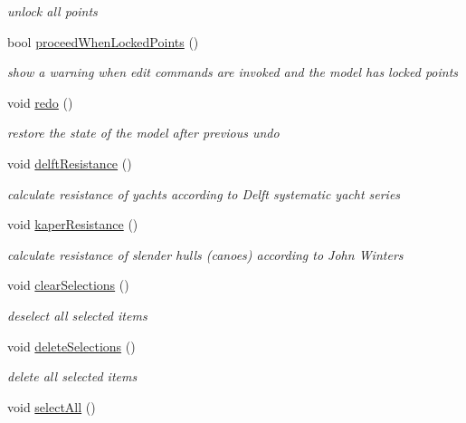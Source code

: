\begin{DoxyCompactItemize}
\begin{DoxyCompactList}\small\item\em unlock all points \end{DoxyCompactList}\item 
bool \hyperlink{classShipCAD_1_1Controller_a2b2d3d9fbd9fd115ae8e80fa57930277}{proceed\-When\-Locked\-Points} ()
\begin{DoxyCompactList}\small\item\em show a warning when edit commands are invoked and the model has locked points \end{DoxyCompactList}\item 
void \hyperlink{classShipCAD_1_1Controller_aeb55fe16b48f14b00c179e95a0372a17}{redo} ()
\begin{DoxyCompactList}\small\item\em restore the state of the model after previous undo \end{DoxyCompactList}\item 
void \hyperlink{classShipCAD_1_1Controller_a6809e5172d21a2bdd439317e533d9c0b}{delft\-Resistance} ()
\begin{DoxyCompactList}\small\item\em calculate resistance of yachts according to Delft systematic yacht series \end{DoxyCompactList}\item 
void \hyperlink{classShipCAD_1_1Controller_ad4335a4380f34eace0a0aa6a3a4abdf5}{kaper\-Resistance} ()
\begin{DoxyCompactList}\small\item\em calculate resistance of slender hulls (canoes) according to John Winters \end{DoxyCompactList}\item 
void \hyperlink{classShipCAD_1_1Controller_a993e2dfe6bb88cf07375e6a57d2d15a5}{clear\-Selections} ()
\begin{DoxyCompactList}\small\item\em deselect all selected items \end{DoxyCompactList}\item 
void \hyperlink{classShipCAD_1_1Controller_a07a48262bd736b3e2e3da4123b1f08a4}{delete\-Selections} ()
\begin{DoxyCompactList}\small\item\em delete all selected items \end{DoxyCompactList}\item 
void \hyperlink{classShipCAD_1_1Controller_a97a0dfdd229e0d7e0e7d5995dd9095a3}{select\-All} ()

\end{DoxyCompactItemize}
